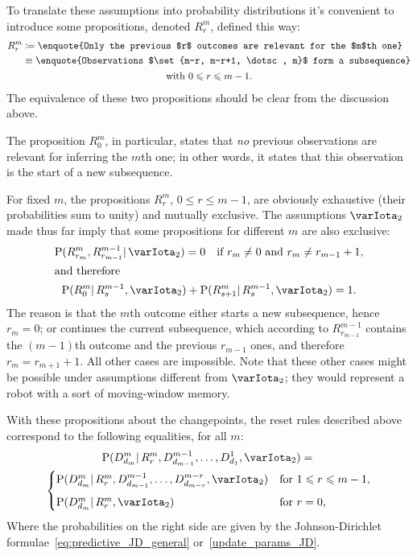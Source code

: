 \documentclass[\ifafour a4paper,12pt,\else a5paper,10pt,\fi%
onecolumn,oneside,article,%
british%
]{memoir}
\theoremstyle{remark}
\theoremstyle{innote}
\newcommand*{\defd}{\coloneqq}
\renewcommand{\le}{\leqslant}%
\DeclarePairedDelimiter\set{\{}{\}}
\newcommand*{\p}{\mathrm{P}}%
\renewcommand*{\|}{\mathpunct{|}}
\newcommand*{\yI}{\varIota}
\newcommand*{\yMc}{\yI_2}
\begin{document}
To translate these assumptions into probability distributions it's
convenient to introduce some propositions, denoted $R^{m}_{r}$, defined
this way:
\begin{multline}
  \label{eq:def_prop_changepoint}
  \begin{aligned}
    R^{m}_{r} &\defd
    \text{\enquote{Only the previous $r$ outcomes are relevant for the $m$th
        one}}
    \\
    &\equiv\text{\enquote{Observations
        $\set{m-r, m-r+1, \dotsc, m}$ form a subsequence}}
  \end{aligned}
  \\ \text{with $0\le r \le m-1$}.
\end{multline}
The equivalence of these two propositions should be clear from the
discussion above.

The proposition $R^{m}_{0}$, in particular, states that \emph{no} previous
observations are relevant for inferring the $m$th one; in other words, it
states that this observation is the start of a new subsequence.

For fixed $m$, the propositions $R^{m}_{r}$, $0\le r \le m-1$, are
obviously exhaustive (their probabilities sum to unity) and mutually
exclusive. The assumptions $\yMc$ made thus far imply that some
propositions for different $m$ are also exclusive:
\begin{gather}
  \label{eq:exclusive_across_m}
  \p(R^{m}_{r_{m}}, R^{m-1}_{r_{m-1}} \| \yMc) = 0
  \quad\text{if $r_{m}\ne 0$ and $r_{m} \ne r_{m-1}+1$},
\\\intertext{and therefore}
  \label{eq:exhaustive_R_from_previous}
  \p(R^{m}_{0} \| R^{m-1}_{s},\yMc) +
  \p(R^{m}_{s+1} \| R^{m-1}_{s},\yMc) = 1.
\end{gather}
The reason is that the $m$th outcome either starts a new subsequence, hence
$r_{m}=0$; or continues the current subsequence, which according to
$R^{m-1}_{r_{m-1}}$ contains the $(m-1)$th outcome and the previous
$r_{m-1}$ ones, and therefore $r_{m}=r_{m+1}+1$. All other cases are
impossible. Note that these other cases might be possible under assumptions
different from $\yMc$; they would represent a robot with a sort of
moving-window memory.

With these propositions about the changepoints, the reset rules described
above correspond to the following equalities, for all $m$:
\begin{multline}
  \label{eq:irrelevant_data_conditional_R}
  \p(D^{m}_{d_{m}} \|
  R^{m}_{r},  D^{m-1}_{d_{m-1}}, \dotsc, D^{1}_{d_{1}}, \yMc)
  ={}\\
  \begin{cases}
  \p(D^{m}_{d_{m}} \|
    R^{m}_{r},  D^{m-1}_{d_{m-1}}, \dotsc, D^{m-r}_{d_{m-r}}, \yMc)
    &\text{for $1\le r\le m-1$},
      \\[2\jot]
  \p(D^{m}_{d_{m}} \|
    R^{m}_{r}, \yMc)
    &\text{for $r=0$},
  \end{cases}
\end{multline}
Where the probabilities on the right side are given by the
Johnson-Dirichlet formulae~\eqref{eq:predictive_JD_general}
or~\eqref{update_params_JD}.
\end{document}
